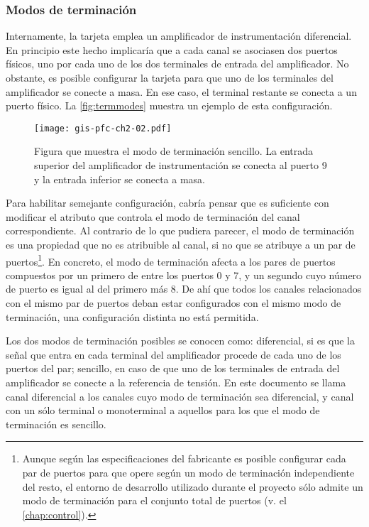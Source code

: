 \subsubsection{Modos de terminación}\label{subsubsec:termmodes}

Internamente, la tarjeta \kpci{} emplea un amplificador de instrumentación
diferencial. En principio este hecho implicaría que a cada canal se
asociasen dos puertos físicos, uno por cada uno de los dos terminales de
entrada del amplificador. No obstante, es posible configurar la tarjeta
para que uno de los terminales del amplificador se conecte a masa. En ese
caso, el terminal restante se conecta a un puerto físico. La
\vref{fig:termmodes} muestra un ejemplo de esta configuración.

\begin{figure}
	\begin{center}
		\texttt{[image: gis-pfc-ch2-02.pdf]}
	\end{center}
	\caption[Ejemplo de configuración de terminación]{Figura que
	muestra el modo de terminación sencillo. La entrada superior del
	amplificador de instrumentación se conecta al puerto 9 y la entrada
	inferior se conecta a masa.}
	\label{fig:termmodes}
\end{figure}

Para habilitar semejante configuración, cabría pensar que es suficiente con
modificar el atributo que controla el modo de terminación del canal
correspondiente. Al contrario de lo que pudiera parecer, el modo de
terminación es una propiedad que no es atribuible al canal, si no que se
atribuye a un par de puertos\footnote{Aunque según las especificaciones del
fabricante es posible configurar cada par de puertos para que opere según
un modo de terminación independiente del resto, el entorno de desarrollo
utilizado durante el proyecto sólo admite un modo de terminación para el
conjunto total de puertos (v. el \vref{chap:control}).}. En concreto, el
modo de terminación afecta a los pares de puertos compuestos por un primero
de entre los puertos 0 y 7, y un segundo cuyo número de puerto es igual al
del primero más 8. De ahí que todos los canales relacionados con el mismo
par de puertos deban estar configurados con el mismo modo de terminación,
una configuración distinta no está permitida.

Los dos modos de terminación posibles se conocen como: diferencial, si es
que la señal que entra en cada terminal del amplificador procede de cada
uno de los puertos del par; sencillo, en caso de que uno de los terminales
de entrada del amplificador se conecte a la referencia de tensión. En este
documento se llama canal diferencial a los canales cuyo modo de terminación
sea diferencial, y canal con un sólo terminal o monoterminal a aquellos
para los que el modo de terminación es sencillo.

